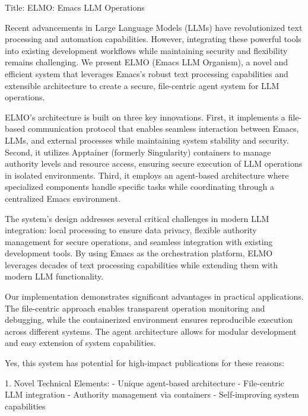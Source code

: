 
Title: ELMO: Emacs LLM Operations



Recent advancements in Large Language Models (LLMs) have revolutionized text processing and automation capabilities. However, integrating these powerful tools into existing development workflows while maintaining security and flexibility remains challenging. We present ELMO (Emacs LLM Organism), a novel and efficient system that leverages Emacs's robust text processing capabilities and extensible architecture to create a secure, file-centric agent system for LLM operations.

ELMO's architecture is built on three key innovations. First, it implements a file-based communication protocol that enables seamless interaction between Emacs, LLMs, and external processes while maintaining system stability and security. Second, it utilizes Apptainer (formerly Singularity) containers to manage authority levels and resource access, ensuring secure execution of LLM operations in isolated environments. Third, it employs an agent-based architecture where specialized components handle specific tasks while coordinating through a centralized Emacs environment.

The system's design addresses several critical challenges in modern LLM integration: local processing to ensure data privacy, flexible authority management for secure operations, and seamless integration with existing development tools. By using Emacs as the orchestration platform, ELMO leverages decades of text processing capabilities while extending them with modern LLM functionality.

Our implementation demonstrates significant advantages in practical applications. The file-centric approach enables transparent operation monitoring and debugging, while the containerized environment ensures reproducible execution across different systems. The agent architecture allows for modular development and easy extension of system capabilities.



Yes, this system has potential for high-impact publications for these reasons:

1. Novel Technical Elements:
- Unique agent-based architecture
- File-centric LLM integration
- Authority management via containers
- Self-improving system capabilities

